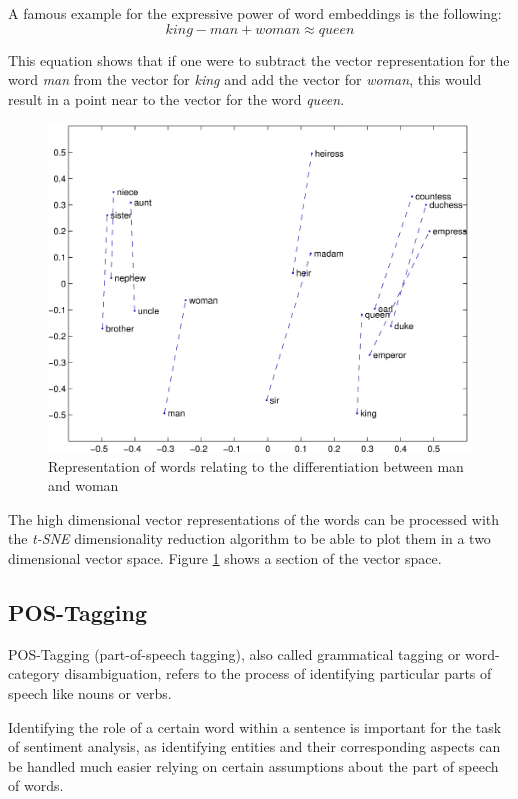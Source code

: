 \documentclass[10pt,a4paper]{article}
\begin{document}
		A famous example for the expressive power of word embeddings is the following:
		\begin{displaymath}
			king-man+woman \approx queen
		\end{displaymath}
		
		This equation shows that if one were to subtract the vector representation for the word \textit{man} from the vector for \textit{king} and add the vector for \textit{woman}, this would result in a point near to the vector for the word \textit{queen}.
		
		\begin{figure}[h]
			\centering
			\includegraphics[width=0.8\linewidth]{data/man_woman}
			\caption{Representation of words relating to the differentiation between man and woman}
			\label{fig:wordembeddings}
		\end{figure}
		
		The high dimensional vector representations of the words can be processed with the \textit{t-SNE} dimensionality reduction algorithm to be able to plot them in a two dimensional vector space. Figure \ref{fig:wordembeddings} shows a section of the vector space.
		
		\subsection{POS-Tagging}

		POS-Tagging (part-of-speech tagging), also called grammatical tagging or word-category disambiguation, refers to the process of identifying particular parts of speech like nouns or verbs. 

		Identifying the role of a certain word within a sentence is important for the task of sentiment analysis, as identifying entities and their corresponding aspects can be handled much easier relying on certain assumptions about the part of speech of words.
\end{document}

